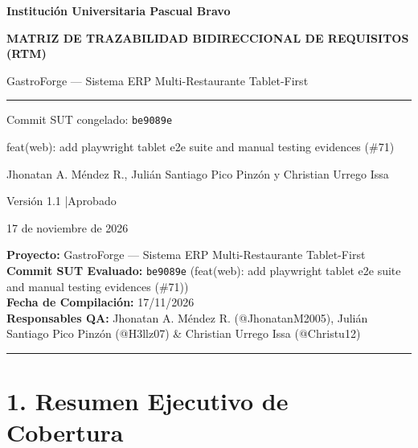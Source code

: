 \documentclass[10pt,a4paper]{article}
\begin{document}
\begin{titlepage}
\thispagestyle{empty}
\centering
\vspace*{1.2cm}
{\large\bfseries Institución Universitaria Pascual Bravo\par}
\vspace{1.2cm}
{\Huge\bfseries\color{gfaccent} MATRIZ DE TRAZABILIDAD BIDIRECCIONAL DE REQUISITOS (RTM)\par}
\vspace{0.6cm}
{\Large GastroForge --- Sistema ERP Multi-Restaurante Tablet-First\par}
\vspace{1.0cm}
\rule{0.6\linewidth}{0.6pt}\par
\vspace{0.8cm}
{\large Commit SUT congelado: \texttt{be9089e}\par}
{\normalsize feat(web): add playwright tablet e2e suite and manual testing evidences (\#71)\par}
\vspace{0.8cm}
{\large Jhonatan A. Méndez R., Julián Santiago Pico Pinzón y Christian Urrego Issa\par}
\vspace{0.6cm}
{\normalsize Versión 1.1 \quad|\quad Aprobado\par}
{\normalsize 17 de noviembre de 2026\par}
\end{titlepage}
\pagestyle{fancy}
{\hypersetup{linkcolor=black}
\renewcommand{\contentsname}{Contenido}
\tableofcontents}
\clearpage

\textbf{Proyecto:} GastroForge --- Sistema ERP Multi-Restaurante Tablet-First\\
\textbf{Commit SUT Evaluado:} \texttt{be9089e} (feat(web): add playwright tablet e2e suite and manual testing evidences (\#71))\\
\textbf{Fecha de Compilación:} 17/11/2026\\
\textbf{Responsables QA:} Jhonatan A. Méndez R. (@JhonatanM2005), Julián Santiago Pico Pinzón (@H3llz07) \& Christian Urrego Issa (@Christu12)

\begin{center}\rule{0.5\linewidth}{0.5pt}\end{center}


\section{1. Resumen Ejecutivo de Cobertura}\label{1-resumen-ejecutivo-de-cobertura}
\end{document}
